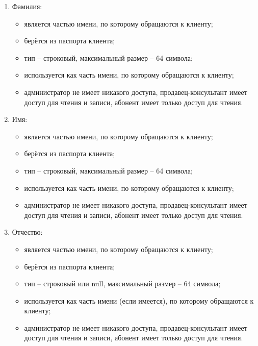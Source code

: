 \begin{enumerate}
\begin{enumerate}
        \item Фамилия:
        \begin{itemize}
            \item является частью имени, по которому обращаются к клиенту;
            \item берётся из паспорта клиента;
            \item тип -- строковый, максимальный размер -- 64 символа;
            \item используется как часть имени, по которому обращаются к клиенту;
            \item администратор не имеет никакого доступа, продавец-консультант имеет доступ для чтения и записи, абонент имеет только доступ для чтения.
        \end{itemize}

        \item Имя:
        \begin{itemize}
            \item является частью имени, по которому обращаются к клиенту;
            \item берётся из паспорта клиента;
            \item тип -- строковый, максимальный размер -- 64 символа;
            \item используется как часть имени, по которому обращаются к клиенту;
            \item администратор не имеет никакого доступа, продавец-консультант имеет доступ для чтения и записи, абонент имеет только доступ для чтения.
        \end{itemize}

        \item Отчество:
        \begin{itemize}
            \item является частью имени, по которому обращаются к клиенту;
            \item берётся из паспорта клиента;
            \item тип -- строковый или null, максимальный размер -- 64 символа;
            \item используется как часть имени (если имеется), по которому обращаются к клиенту;
            \item администратор не имеет никакого доступа, продавец-консультант имеет доступ для чтения и записи, абонент имеет только доступ для чтения.
        \end{itemize}


\end{enumerate}
\end{enumerate}
